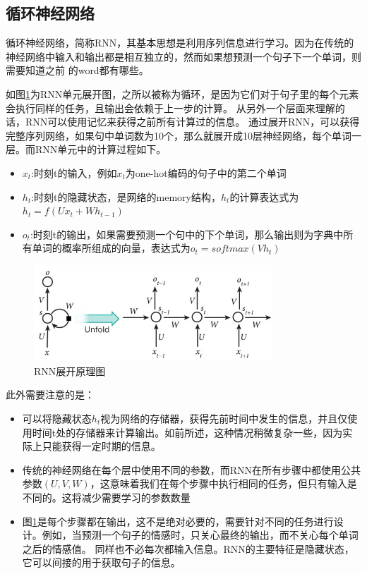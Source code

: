 \documentclass[supercite]{HustGraduPaper}
\theoremstyle{definition}
\begin{document}
\subsection{循环神经网络}
循环神经网络，简称RNN\cite{mikolov2010recurrent}，其基本思想是利用序列信息进行学习。因为在传统的神经网络中输入和输出都是相互独立的，然而如果想预测一个句子下一个单词，则需要知道之前
的word都有哪些。

如图\ref{Fig.rnn}为RNN单元展开图，之所以被称为循环，是因为它们对于句子里的每个元素会执行同样的任务，且输出会依赖于上一步的计算。
从另外一个层面来理解的话，RNN可以使用记忆来获得之前所有计算过的信息。
通过展开RNN，可以获得完整序列网络，如果句中单词数为10个，那么就展开成10层神经网络，每个单词一层。而RNN单元中的计算过程如下。

\begin{itemize}
  \item $x_t$:时刻t的输入，例如$x_t$为one-hot编码的句子中的第二个单词
  \item $h_t$:时刻t的隐藏状态，是网络的memory结构，$h_t$的计算表达式为$h_t=f(Ux_t + Wh_{t-1})$
  \item $o_t$:时刻t的输出，如果需要预测一个句中的下个单词，那么输出则为字典中所有单词的概率所组成的向量，表达式为$o_t = softmax(Vh_t)$
\end{itemize}

\begin{figure}[htbp] %
  \centering %
  \includegraphics[width=0.8\textwidth]{images/rnn.png} %
  \caption{RNN展开原理图} %
  \label{Fig.rnn} %
\end{figure}

此外需要注意的是：
\begin{itemize}
  \item 可以将隐藏状态$h_t$视为网络的存储器，获得先前时间中发生的信息，并且仅使用时间t处的存储器来计算输出。如前所述，这种情况稍微复杂一些，因为实际上只能获得一定时期的信息。
  \item 传统的神经网络在每个层中使用不同的参数，而RNN在所有步骤中都使用公共参数$(U,V,W)$，这意味着我们在每个步骤中执行相同的任务，但只有输入是不同的。这将减少需要学习的参数数量
  \item 图\ref{Fig.rnn}是每个步骤都在输出，这不是绝对必要的，需要针对不同的任务进行设计。例如，当预测一个句子的情感时，只关心最终的输出，而不关心每个单词之后的情感值。
  同样也不必每次都输入信息。RNN的主要特征是隐藏状态，它可以间接的用于获取句子的信息。
\end{itemize}
\end{document}

